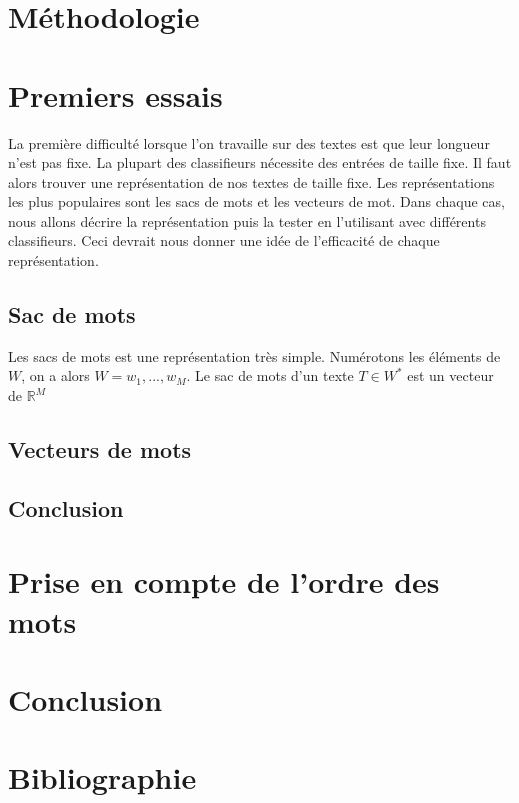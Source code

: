 \documentclass{article}
\begin{document}


\section{Méthodologie}

\section{Premiers essais}

La première difficulté lorsque l'on travaille sur des textes est que leur longueur n'est pas fixe. La plupart des classifieurs nécessite des entrées de taille fixe. Il faut alors trouver une représentation de nos textes de taille fixe. Les représentations les plus populaires sont les sacs de mots et les vecteurs de mot. Dans chaque cas, nous allons décrire la représentation puis la tester en l'utilisant avec différents classifieurs. Ceci devrait nous donner une idée de l'efficacité de chaque représentation.

\subsection{Sac de mots}


Les sacs de mots est une représentation très simple. Numérotons les éléments de $W$, on a alors $W={w_{1}, ..., w_{M}}$. Le sac de mots d'un texte $T \in W^{*}$ est un vecteur de $\mathbb{R}^{M}$ 

\subsection{Vecteurs de mots}


\subsection{Conclusion}



\section{Prise en compte de l'ordre des mots}

\section{Conclusion}

\section{Bibliographie}
\end{document}
